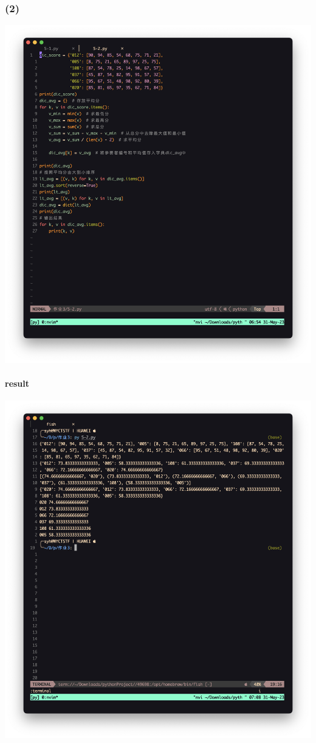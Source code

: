 \documentclass{beamer}
\begin{document}
  \begin{frame}[fragile]
    \frametitle{(2)}
    \centering
    \includegraphics[width=\textwidth,height=0.8\textheight]{graph/5-2.png}
  \end{frame}
  \begin{frame}[fragile]
    \framesubtitle{result}
    \centering
    \includegraphics[width=\textwidth,height=0.8\textheight]{graph/_5-2.png}
  \end{frame}
\end{document}
